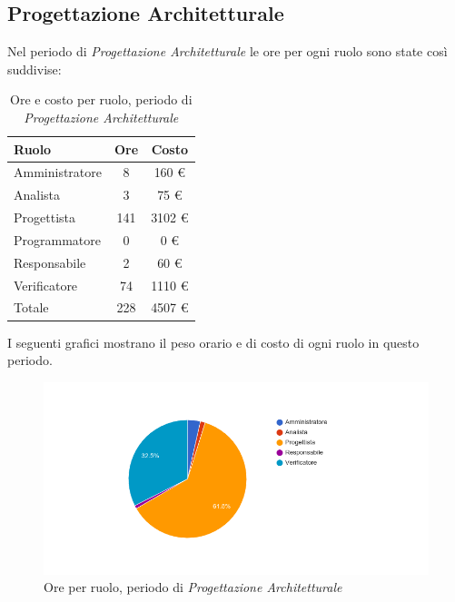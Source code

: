 \subsection{Progettazione Architetturale}
Nel periodo di \textit{Progettazione Architetturale} le ore per ogni ruolo sono state cos\`i suddivise:

\begin{table}[H]
	\centering
	\begin{tabular}{ l c c }
		\textbf{Ruolo} & \textbf{Ore} & \textbf{Costo} \\
		\hline
		Amministratore & 8 & 160 \euro{} \\
		Analista & 3 & 75 \euro{} \\
		Progettista & 141 & 3102 \euro{} \\
		Programmatore & 0 & 0 \euro{} \\
		Responsabile & 2 & 60 \euro{} \\
		Verificatore & 74 & 1110 \euro{} \\
		\hline
		Totale & 228 & 4507 \euro{} \\
		\hline
	\end{tabular}
	\caption{Ore e costo per ruolo, periodo di \textit{Progettazione Architetturale}}
\end{table}

I seguenti grafici mostrano il peso orario e di costo di ogni ruolo in questo periodo.

\begin{figure}[H]
  \begin{center}
    \includegraphics[width=15cm]{res/img/prospettoEconomico/orePerRuoloProgettazioneArchitetturale.png}
  \caption{Ore per ruolo, periodo di \textit{Progettazione Architetturale}}
  \end{center} 
\end{figure}  

